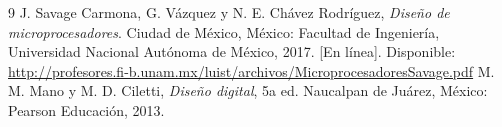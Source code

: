 \renewcommand{\refname}{Bibliografía}
\begin{thebibliography}{9}
 J. Savage Carmona, G. Vázquez y N. E. Chávez Rodríguez,
  \emph{Diseño de microprocesadores}. Ciudad de México, México: Facultad de Ingeniería,
  Universidad Nacional Autónoma de México, 2017. [En línea]. Disponible:
  \url{http://profesores.fi-b.unam.mx/luist/archivos/MicroprocesadoresSavage.pdf}
 M. M. Mano y M. D. Ciletti, \emph{Diseño digital}, 5a ed.
  Naucalpan de Juárez, México: Pearson Educación, 2013.
\end{thebibliography}


